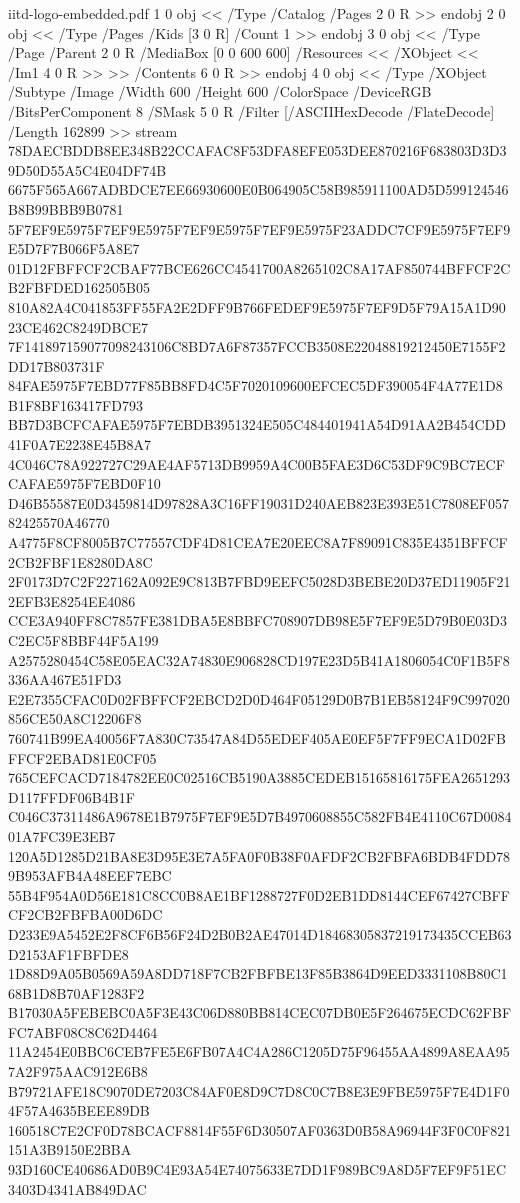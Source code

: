 \begin{filecontents*}[overwrite]{iitd-logo-embedded.pdf}
1 0 obj
<< /Type /Catalog /Pages 2 0 R >>
endobj
2 0 obj
<< /Type /Pages /Kids [3 0 R] /Count 1 >>
endobj
3 0 obj
<< /Type /Page /Parent 2 0 R /MediaBox [0 0 600 600] /Resources << /XObject << /Im1 4 0 R >> >> /Contents 6 0 R >>
endobj
4 0 obj
<< /Type /XObject /Subtype /Image /Width 600 /Height 600 /ColorSpace /DeviceRGB /BitsPerComponent 8 /SMask 5 0 R /Filter [/ASCIIHexDecode /FlateDecode] /Length 162899 >>
stream
78DAECBDDB8EE348B22CCAFAC8F53DFA8EFE053DEE870216F683803D3D39D50D55A5C4E04DF74B
6675F565A667ADBDCE7EE66930600E0B064905C58B985911100AD5D599124546B8B99BBB9B0781
5F7EF9E5975F7EF9E5975F7EF9E5975F7EF9E5975F23ADDC7CF9E5975F7EF9E5D7F7B066F5A8E7
01D12FBFFCF2CBAF77BCE626CC4541700A8265102C8A17AF850744BFFCF2CB2FBFDED162505B05
810A82A4C041853FF55FA2E2DFF9B766FEDEF9E5975F7EF9D5F79A15A1D9023CE462C8249DBCE7
7F141897159077098243106C8BD7A6F87357FCCB3508E22048819212450E7155F2DD17B803731F
84FAE5975F7EBD77F85BB8FD4C5F7020109600EFCEC5DF390054F4A77E1D8B1F8BF163417FD793
BB7D3BCFCAFAE5975F7EBDB3951324E505C484401941A54D91AA2B454CDD41F0A7E2238E45B8A7
4C046C78A922727C29AE4AF5713DB9959A4C00B5FAE3D6C53DF9C9BC7ECFCAFAE5975F7EBD0F10
D46B55587E0D3459814D97828A3C16FF19031D240AEB823E393E51C7808EF05782425570A46770
A4775F8CF8005B7C77557CDF4D81CEA7E20EEC8A7F89091C835E4351BFFCF2CB2FBF1E8280DA8C
2F0173D7C2F227162A092E9C813B7FBD9EEFC5028D3BEBE20D37ED11905F212EFB3E8254EE4086
CCE3A940FF8C7857FE381DBA5E8BBFC708907DB98E5F7EF9E5D79B0E03D3C2EC5F8BBF44F5A199
A2575280454C58E05EAC32A74830E906828CD197E23D5B41A1806054C0F1B5F8336AA467E51FD3
E2E7355CFAC0D02FBFFCF2EBCD2D0D464F05129D0B7B1EB58124F9C997020856CE50A8C12206F8
760741B99EA40056F7A830C73547A84D55EDEF405AE0EF5F7FF9ECA1D02FBFFCF2EBAD81E0CF05
765CEFCACD7184782EE0C02516CB5190A3885CEDEB15165816175FEA2651293D117FFDF06B4B1F
C046C37311486A9678E1B7975F7EF9E5D7B4970608855C582FB4E4110C67D008401A7FC39E3EB7
120A5D1285D21BA8E3D95E3E7A5FA0F0B38F0AFDF2CB2FBFA6BDB4FDD789B953AFB4A48EEF7EBC
55B4F954A0D56E181C8CC0B8AE1BF1288727F0D2EB1DD8144CEF67427CBFFCF2CB2FBFBA00D6DC
D233E9A5452E2F8CF6B56F24D2B0B2AE47014D18468305837219173435CCEB63D2153AF1FBFDE8
1D88D9A05B0569A59A8DD718F7CB2FBFBE13F85B3864D9EED3331108B80C168B1D8B70AF1283F2
B17030A5FEBEBC0A5F3E43C06D880BB814CEC07DB0E5F264675ECDC62FBFFC7ABF08C8C62D4464
11A2454E0BBC6CEB7FE5E6FB07A4C4A286C1205D75F96455AA4899A8EAA957A2F975AAC912E6B8
B79721AFE18C9070DE7203C84AF0E8D9C7D8C0C7B8E3E9FBE5975F7E4D1F04F57A4635BEEE89DB
160518C7E2CF0D78BCACF8814F55F6D30507AF0363D0B58A96944F3F0C0F821151A3B9150E2BBA
93D160CE40686AD0B9C4E93A54E74075633E7DD1F989BC9A8D5F7EF9F51EC3403D4341AB849DAC

\end{filecontents*}
